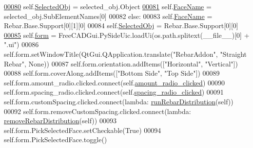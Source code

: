 \begin{DoxyCode}
\hypertarget{StraightRebar_8py_source.tex_l00080}{}\hyperlink{classStraightRebar_1_1__StraightRebarTaskPanel_a4bdbe85e1cc468f34a907db99faebe85}{00080}             self.\hyperlink{classStraightRebar_1_1__StraightRebarTaskPanel_a4bdbe85e1cc468f34a907db99faebe85}{SelectedObj} = selected\_obj.Object
\hypertarget{StraightRebar_8py_source.tex_l00081}{}\hyperlink{classStraightRebar_1_1__StraightRebarTaskPanel_afe733532cc15a149f9ba8f7da4515413}{00081}             self.\hyperlink{classStraightRebar_1_1__StraightRebarTaskPanel_afe733532cc15a149f9ba8f7da4515413}{FaceName} = selected\_obj.SubElementNames[0]
00082         \textcolor{keywordflow}{else}:
00083             self.\hyperlink{classStraightRebar_1_1__StraightRebarTaskPanel_afe733532cc15a149f9ba8f7da4515413}{FaceName} = Rebar.Base.Support[0][1][0]
00084             self.\hyperlink{classStraightRebar_1_1__StraightRebarTaskPanel_a4bdbe85e1cc468f34a907db99faebe85}{SelectedObj} = Rebar.Base.Support[0][0]
\hypertarget{StraightRebar_8py_source.tex_l00085}{}\hyperlink{classStraightRebar_1_1__StraightRebarTaskPanel_a88b76fa56bfa51be091abb0cde42a0e0}{00085}         self.\hyperlink{classStraightRebar_1_1__StraightRebarTaskPanel_a88b76fa56bfa51be091abb0cde42a0e0}{form} = FreeCADGui.PySideUic.loadUi(os.path.splitext(\_\_file\_\_)[0] + \textcolor{stringliteral}{".ui"})
00086         self.form.setWindowTitle(QtGui.QApplication.translate(\textcolor{stringliteral}{"RebarAddon"}, \textcolor{stringliteral}{"Straight Rebar"}, \textcolor{keywordtype}{None}))
00087         self.form.orientation.addItems([\textcolor{stringliteral}{"Horizontal"}, \textcolor{stringliteral}{"Vertical"}])
00088         self.form.coverAlong.addItems([\textcolor{stringliteral}{"Bottom Side"}, \textcolor{stringliteral}{"Top Side"}])
00089         self.form.amount\_radio.clicked.connect(self.\hyperlink{classStraightRebar_1_1__StraightRebarTaskPanel_a845630e065bb13e756284e71476dd755}{amount\_radio\_clicked})
00090         self.form.spacing\_radio.clicked.connect(self.\hyperlink{classStraightRebar_1_1__StraightRebarTaskPanel_a03ed1cd992f5b138153b6a45de7777f9}{spacing\_radio\_clicked})
00091         self.form.customSpacing.clicked.connect(\textcolor{keyword}{lambda}: \hyperlink{namespaceRebarDistribution_aa547df5cb10d2e64eaa0b51c445fa30b}{runRebarDistribution}(self))
00092         self.form.removeCustomSpacing.clicked.connect(\textcolor{keyword}{lambda}: 
      \hyperlink{namespaceRebarDistribution_a85270a1b6e8c782a9e0ba54add518f2a}{removeRebarDistribution}(self))
00093         self.form.PickSelectedFace.setCheckable(\textcolor{keyword}{True})
00094         self.form.PickSelectedFace.toggle()

\end{DoxyCode}
